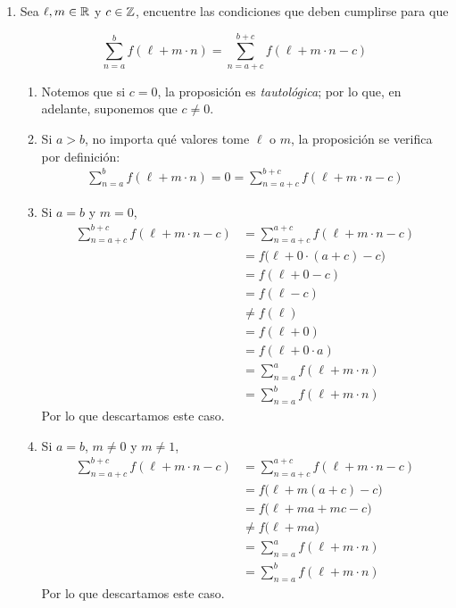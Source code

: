 \begin{enumerate}[label=\alph*)]
  \textbf{Nota:} En esta proposición se restringe que $a\leq b$, pues si $a>b$, se tiene que $\sum_{n=a}^{b} c = 0 \neq (b-a+1)c$; únicamente en el caso que $c=0$, se cumpliría la igualdad con $a>b$.

  \textbf{Definición:} $(b-a+1)$ es el número de \textit{iteraciones}, \textit{cíclos}, o \textit{sumandos} de la sumatoria $\sum_{n=a}^{b} f(n)$.

   Si $c\in \R$ y $n\in \N$, entonces $\sum_{i=1}^n c = nc$.
  \begin{proof} $\sum_{i=1}^n c = \bigl((n-1)+1\bigr) c = nc$.
  \end{proof}

  \item Sea $\ell, m\in \mathbb{R}$ y $c\in \mathbb{Z}$, encuentre las condiciones que deben cumplirse para que
  
  \[\sum_{n=a}^b f(\ell+m\cdot n) = \sum_{n=a+c}^{b+c} f(\ell+m\cdot n-c)\]

  \begin{enumerate}[label=\Roman*)]
    \item Notemos que si $c=0$, la proposición es \textit{tautológica}; por lo que, en adelante, suponemos que $c\neq 0$.
    \item Si $a>b$, no importa qué valores tome $\ell$ o $m$, la proposición se verifica por definición:
    \begin{align*}
      \sum_{n=a}^b f(\ell+m\cdot n) = 0 = \sum_{n=a+c}^{b+c} f(\ell+m\cdot n-c)
    \end{align*}
    \item Si $a=b$ y $m=0$,
    \begin{align*}
      \sum_{n=a+c}^{b+c} f(\ell+m\cdot n-c) &= \sum_{n=a+c}^{a+c} f(\ell+m\cdot n-c)\\
      &= f\bigl(\ell+0\cdot (a+c)-c\bigr)\\
      &=f(\ell+0-c)\\
      &= f(\ell-c)\\
      &\neq f(\ell)\\
      &= f(\ell+0)\\
      &= f(\ell+0\cdot a)\\
      &= \sum_{n=a}^a f(\ell+m\cdot n)\\
      &= \sum_{n=a}^b f(\ell+m\cdot n)
    \end{align*}
    Por lo que descartamos este caso.

    \item Si $a=b$, $m\neq 0$ y $m\neq 1$,
    \begin{align*}
      \sum_{n=a+c}^{b+c} f(\ell+m\cdot n-c) &= \sum_{n=a+c}^{a+c} f(\ell+m\cdot n-c)\\
      &= f\bigl(\ell+m(a+c)-c\bigr)\\
      &= f\bigl(\ell+ma+mc-c\bigr)\\
      &\neq f\bigl(\ell+ma\bigr)\\
      &= \sum_{n=a}^a f(\ell+m\cdot n)\\
      &= \sum_{n=a}^b f(\ell+m\cdot n)
    \end{align*}
    Por lo que descartamos este caso.


\end{enumerate}
\end{enumerate}
